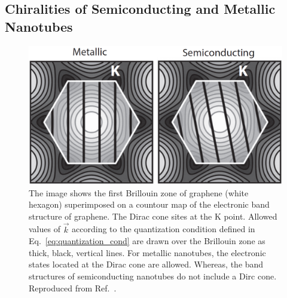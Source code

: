 \subsection{Chiralities of Semiconducting and Metallic Nanotubes}

\begin{figure}[ht]
	\centering
	\includegraphics[scale=0.35]{images/chapter_optical_props/metal_semi_amori}
	\caption{The image shows the first Brillouin zone of graphene (white hexagon) superimposed on a countour map of the electronic band structure of graphene. The Dirac cone sites at the K point. Allowed values of $\vec{k}$ according to the quantization condition defined in Eq.\ \ref{eq:quantization_cond} are drawn over the Brillouin zone as thick, black, vertical lines. For metallic nanotubes, the electronic states located at the Dirac cone are allowed. Whereas, the band structures of semiconducting nanotubes do not include a Dirc cone. Reproduced from Ref.\ \cite{amori2018excitons}.}
	\label{fig:k_quant}
\end{figure}

